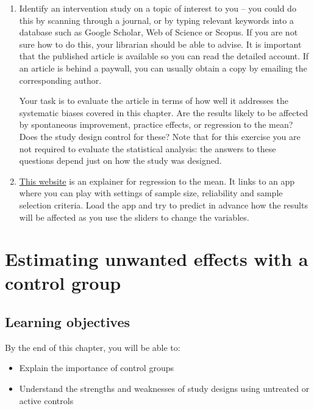 \documentclass{krantz}
\begin{document}
\begin{enumerate}
\def\labelenumi{\arabic{enumi}.}
\item
  Identify an intervention study on a topic of interest to you -- you could do this by scanning through a journal, or by typing relevant keywords into a database such as Google Scholar, Web of Science or Scopus. If you are not sure how to do this, your librarian should be able to advise. It is important that the published article is available so you can read the detailed account. If an article is behind a paywall, you can usually obtain a copy by emailing the corresponding author.

  Your task is to evaluate the article in terms of how well it addresses the systematic biases covered in this chapter. Are the results likely to be affected by spontaneous improvement, practice effects, or regression to the mean? Does the study design control for these? Note that for this exercise you are not required to evaluate the statistical analysis: the answers to these questions depend just on how the study was designed.
\item
  \href{https://www.andifugard.info/regression-to-the-mean/}{This website} is an explainer for regression to the mean. It links to an app where you can play with settings of sample size, reliability and sample selection criteria. Load the app and try to predict in advance how the results will be affected as you use the sliders to change the variables.
\end{enumerate}

\hypertarget{controls}{%
\chapter{Estimating unwanted effects with a control group}\label{controls}}

\hypertarget{learning-objectives-5}{%
\section{Learning objectives}\label{learning-objectives-5}}

By the end of this chapter, you will be able to:

\begin{itemize}
\item
  Explain the importance of control groups
\item
  Understand the strengths and weaknesses of study designs using untreated or active controls
\end{itemize}
\end{document}
